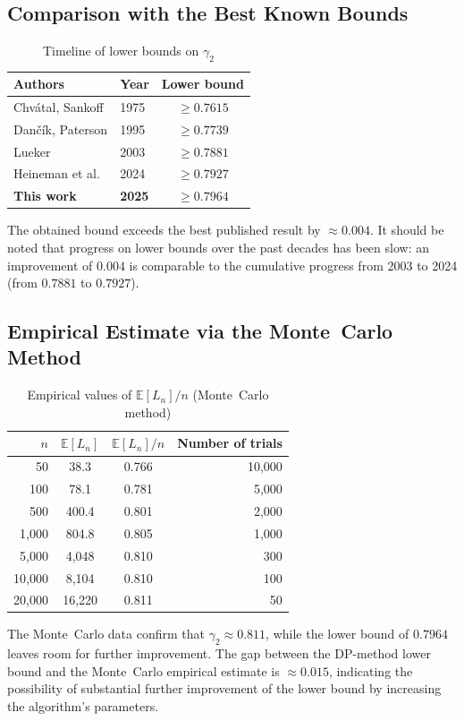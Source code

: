 \documentclass[12pt,a4paper]{article}
\begin{document}
\subsection{Comparison with the Best Known Bounds}
\begin{table}[h]
\centering
\caption{Timeline of lower bounds on $\gamma_2$}
\label{tab:comparison}
\begin{tabular}{llc}
  \toprule
  \textbf{Authors} & \textbf{Year} & \textbf{Lower bound} \\
  \midrule
  Chv\'{a}tal, Sankoff & 1975 & $\geq 0.7615$ \\
  Dan\v{c}\'{i}k, Paterson & 1995 & $\geq 0.7739$ \\
  Lueker & 2003 & $\geq 0.7881$ \\
  Heineman et al. & 2024 & $\geq 0.7927$ \\
  \textbf{This work} & \textbf{2025} & $\geq \mathbf{0.7964}$ \\
  \bottomrule
\end{tabular}
\end{table}
The obtained bound exceeds the best published result by $\approx 0.004$.
It should be noted that progress on lower bounds over the past decades has been slow: an improvement of $0.004$ is comparable to the cumulative progress from 2003 to 2024 (from $0.7881$ to $0.7927$).

\subsection{Empirical Estimate via the Monte~Carlo Method}
\begin{table}[h]
\centering
\caption{Empirical values of $\mathbb{E}[L_n]/n$ (Monte~Carlo method)}
\label{tab:monte_carlo}
\begin{tabular}{rccr}
  \toprule
  $n$ & $\mathbb{E}[L_n]$ & $\mathbb{E}[L_n]/n$ & Number of trials \\
  \midrule
  50 & 38.3 & 0.766 & 10{,}000 \\
  100 & 78.1 & 0.781 & 5{,}000 \\
  500 & 400.4 & 0.801 & 2{,}000 \\
  1{,}000 & 804.8 & 0.805 & 1{,}000 \\
  5{,}000 & 4{,}048 & 0.810 & 300 \\
  10{,}000 & 8{,}104 & 0.810 & 100 \\
  20{,}000 & 16{,}220 & 0.811 & 50 \\
  \bottomrule
\end{tabular}
\end{table}
The Monte~Carlo data confirm that $\gamma_2 \approx 0.811$, while the lower bound of $0.7964$ leaves room for further improvement.
The gap between the DP-method lower bound and the Monte~Carlo empirical estimate is $\approx 0.015$, indicating the possibility of substantial further improvement of the lower bound by increasing the algorithm's parameters.
\end{document}
